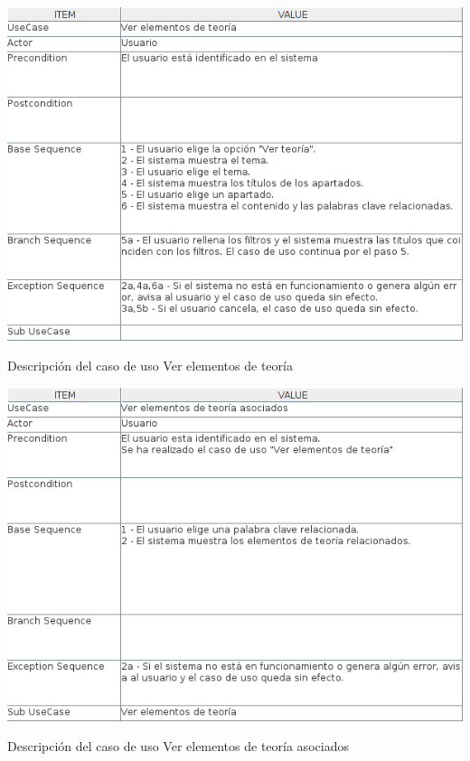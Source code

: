 \documentclass[openright,twoside,10pt]{book}
\begin{document}
    \begin{table}[H]
        \begin{center}
            \includegraphics[width=\textwidth]{img/astah/analisis/casos_de_uso/useCase01.png}
        \end{center}
        \caption{Descripción del caso de uso Ver elementos de teoría}
    \end{table}
    
    \vspace*{\fill}
    
    \newpage
    
    \vspace*{\fill}
    
    \begin{table}[H]
        \begin{center}
            \includegraphics[width=\textwidth]{img/astah/analisis/casos_de_uso/useCase02.png}
        \end{center}
        \caption{Descripción del caso de uso Ver elementos de teoría asociados}
    \end{table}
    
\end{document}
